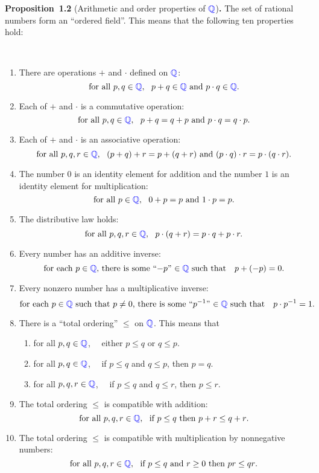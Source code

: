 \documentclass[12pt]{amsart}
\newcommand{\Q}{ {\color{blue} \mathbb{Q} }}
\begin{document}
\noindent \textbf{Proposition~1.2} (Arithmetic and order properties of $\Q$)\textbf{.} The set of rational numbers form an ``ordered field''. This means that the following ten properties hold:

\



\begin{enumerate}

\item There are operations $+$ and $\cdot$ defined on $\Q$:
\[\text{for all $p, q\in \Q$}, \ \ p + q\in \Q \ \text{and} \ p \cdot q\in \Q.\]



\item Each of $+$ and $\cdot$ is a commutative operation:
\[\text{for all $p,q\in \Q$}, \ \ p + q = q + p \ \text{and} \ p \cdot q = q \cdot p.\]



\item Each of $+$ and $\cdot$ is an associative  operation:
\[\text{for all $p,q,r\in \Q$}, \ \  (p + q) + r = p + (q + r)\  \text{and}\   (p \cdot q) \cdot r = p \cdot (q \cdot r).\] 



\item The number $0$ is an identity element for addition and the number $1$ is an identity element for multiplication:
 \[\text{for all $p \in \Q$}, \ \ 0 + p=p \ \text{and} \ 1 \cdot p = p .\]
 
\item The distributive law holds: 
\[\text{for all $p,q,r\in \Q$}, \ \  p \cdot (q + r) = p \cdot q + p \cdot r.\] 

\item Every number has an additive inverse:
\[\text{for each $p \in \Q$, there is some ``$-p$'' $\in \Q$ such that } \ \ p + (-p)=0 .\]


\item Every nonzero number has a multiplicative inverse: 
\[\text{for each  $p \in \Q$ such that $p\neq 0$, there is some ``$p^{-1}$'' $\in \Q$ such that } \ \ p \cdot p^{-1}=1 .\]

\item There is a ``total ordering'' $\leq$ on $\Q$. This means that 
\begin{enumerate}
\item for all $p,q\in \Q$, \ \ either $p \leq q$ or $q \leq p$.
\item for all $p,q\in \Q$, \  \ if $p \leq q$ and $q \leq p$, then $p = q$.
\item for all $p,q,r\in \Q$, \ \ if $p \leq q$ and $q \leq r$, then $p \leq r$.
\end{enumerate}

\medskip
\item The total ordering $\leq$ is compatible with addition:
\[\text{for all $p,q,r\in \Q$}, \ \  \text{if $p \leq q$ then $p + r \leq q + r$}.\] 
 
\item The total ordering $\leq$ is compatible with multiplication by nonnegative numbers: 
\[\text{for all $p,q,r\in \Q$}, \ \  \text{if $p \leq q$ and $r \geq 0$ then $pr \leq qr$}.\] 
\end{enumerate}
\end{document}
